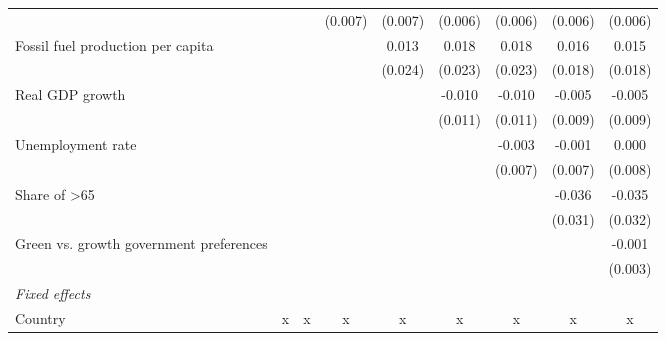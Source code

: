 \begin{table}[htbp]
\begin{tabular}{lcccccccc}
                                                &                &                & (0.007)       & (0.007)       & (0.006)        & (0.006)        & (0.006)        & (0.006)\\   
      Fossil fuel production per capita         &                &                &               & 0.013         & 0.018          & 0.018          & 0.016          & 0.015\\   
                                                &                &                &               & (0.024)       & (0.023)        & (0.023)        & (0.018)        & (0.018)\\   
      Real GDP growth                           &                &                &               &               & -0.010         & -0.010         & -0.005         & -0.005\\   
                                                &                &                &               &               & (0.011)        & (0.011)        & (0.009)        & (0.009)\\   
      Unemployment rate                         &                &                &               &               &                & -0.003         & -0.001         & 0.000\\   
                                                &                &                &               &               &                & (0.007)        & (0.007)        & (0.008)\\   
      Share of >65                              &                &                &               &               &                &                & -0.036         & -0.035\\   
                                                &                &                &               &               &                &                & (0.031)        & (0.032)\\   
      Green vs. growth government preferences   &                &                &               &               &                &                &                & -0.001\\   
                                                &                &                &               &               &                &                &                & (0.003)\\   
      \emph{Fixed effects}\\
      Country                                   & x              & x              & x             & x             & x              & x              & x              & x\\  

\end{tabular}
\end{table}
